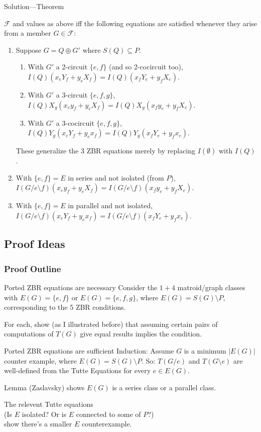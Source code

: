 \documentclass{beamer}
\begin{document}
\begin{frame}{Solution---Theorem}
\begin{theorem}
$\mathcal{F}$ and values as above
 iff the following equations
are satisfied whenever they arise from a member $G\in\mathcal{F}$:
\begin{enumerate}
\item Suppose $G=Q\oplus G'$ where $S(Q)\subseteq P$.
\begin{enumerate}
\item With $G'$ a 2-circuit $\{e,f\}$ (and so 2-cocircuit too),
$I(Q)(x_eY_f+y_eX_f)=I(Q)(x_fY_e+y_fX_e)$.
\item
With $G'$ a 3-circuit $\{e,f,g\}$,
$I(Q)X_g(x_ey_f+y_eX_f)=
I(Q)X_g(x_fy_e+y_fX_e)$. 
\item 
With $G'$ a 3-cocircuit $\{e,f,g\}$,
$I(Q)Y_g(x_eY_f+y_ex_f)=
I(Q)Y_g(x_fY_e+y_fx_e)$. 
\end{enumerate}
These generalize the 3 ZBR equations merely by replacing
$I(\emptyset)$ with $I(Q)$.
\item With $\{e,f\}=E$ in series and not isolated (from $P$),
$I(G/e\setminus f)(x_ey_f+y_eX_f)=
I(G/e\setminus f)(x_fy_e+y_fX_e)$.
\item With $\{e,f\}=E$ in parallel and not isolated,
$I(G/e\setminus f)(x_eY_f+y_ex_f)=
I(G/e\setminus f)(x_fY_e+y_fx_e)$.
\end{enumerate}
\end{theorem}
\end{frame}

\subsection{Proof Ideas}
\begin{frame}
\frametitle{Proof Outline}
\begin{block}{Ported ZBR equations are necessary}
Consider the $1+4$ matroid/graph classes 
with $E(G)=\{e,f\}$ or $E(G)=\{e,f,g\}$,
where $E(G)=S(G)\setminus P$, corresponding
to the 5 ZBR conditions.

For each, show (as I illustrated before)
that assuming certain pairs of computations of $T(G)$
give equal results implies the condition.
\end{block}
\begin{block}{Ported ZBR equations are sufficient}
Induction: Assume $G$ is a minimum $|E(G)|$ counter example, 
where $E(G)=S(G)\setminus P$.  So: $T(G/e)$ and $T(G\setminus e)$
are well-defined from the Tutte Equations for every $e\in E(G)$.

Lemma (Zaslavsky) shows  $E(G)$ is a series class
or a parallel class.

The relevent Tutte equations\\
 (Is $E$ isolated? Or is $E$ connected to some of $P$?)\\
show there's a smaller $E$ counterexample.
\end{block}
\end{frame}
\end{document}
